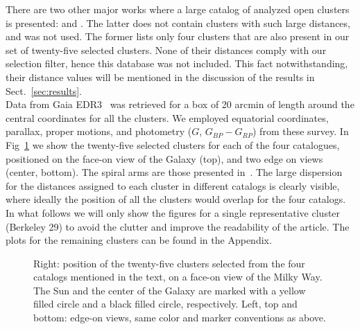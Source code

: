 \documentclass{aa}
\begin{document}
 There are two other major works where a large catalog of analyzed open clusters
 is presented: \cite{Lui_2019} and \cite{Dias_2021}. The latter does not contain
 clusters with such large distances, and was not used. The former lists
 only four clusters that are also present in our set of twenty-five selected
 clusters. None of their distances comply with our selection filter, hence this
 database was not included. This fact notwithstanding, their distance values will
 be mentioned in the discussion of the results in Sect.~\ref{sec:results}.\\

 Data from Gaia EDR3~\citep{Gaia_2016,Gaia_EDR3} was retrieved for a box of 20
 arcmin of length around the central coordinates for all the clusters. We
 employed equatorial coordinates, parallax, proper motions, and photometry
 ($G$, $G_{BP}-G_{RP}$) from these survey.
 In Fig~\ref{fig:MWmap} we show the twenty-five selected clusters for each of
 the four catalogues, positioned on the face-on view of the Galaxy (top), and
 two edge on views (center, bottom). The spiral arms are those presented
 in~\cite{Momany_2006}. The large dispersion for the distances
 assigned to each cluster in different catalogs is clearly visible, where
 ideally the position of all the clusters would overlap for the four catalogs.\\

 In what follows we will only show the figures for a single representative
 cluster (Berkeley 29) to avoid the clutter and improve the readability of the
 article. The plots for the remaining clusters can be found in the Appendix.

 \begin{figure}
  \caption{Right: position of the twenty-five clusters selected from the four
  catalogs mentioned in the text, on a face-on view of the Milky Way. The Sun
  and the center of the Galaxy are marked with a yellow filled circle and a
  black filled circle, respectively. Left, top and bottom: edge-on views,
  same color and marker conventions as above.}
  \label{fig:MWmap}
 \end{figure}
\end{document}
